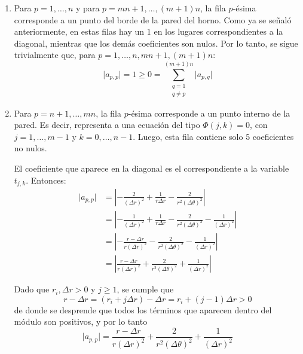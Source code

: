         \begin{enumerate}[label=(\roman*)]
            \item Para $p = 1, \dots, n$ y para $p = mn + 1, \dots, (m+1)n$, la fila $p$-ésima corresponde a un punto del borde de la pared del horno. Como ya se señaló anteriormente, en estas filas hay un $1$ en los lugares correspondientes a la diagonal, mientras que los demás coeficientes son nulos. Por lo tanto, se sigue trivialmente que, para $p = 1, \dots, n, mn + 1, (m+1)n$:
            \[ \vert a_{p,p} \vert = 1 \geq 0 = \sum_{\substack{q=1 \\ q \neq p}}^{(m+1)n} \vert a_{p,q} \vert \]

            \item Para $p = n + 1, \dots, mn$, la fila $p$-ésima corresponde a un punto interno de la pared. Es decir, representa a una ecuación del tipo $\Phi(j,k) = 0$, con $j = 1, \dots, m - 1$ y $k = 0, \dots, n - 1$. Luego, esta fila contiene solo 5 coeficientes no nulos.

            El coeficiente que aparece en la diagonal es el correspondiente a la variable $t_{j,k}$. Entonces:
            \[ \begin{split}
                \vert a_{p,p} \vert &= \left \vert - \frac{2}{(\Delta r)^2} + \frac{1}{r \Delta r} - \frac{2}{r^2 (\Delta \theta)^2} \right \vert \\
                &= \left \vert - \frac{1}{(\Delta r)^2} + \frac{1}{r \Delta r} - \frac{2}{r^2 (\Delta \theta)^2} - \frac{1}{(\Delta r)^2} \right \vert \\
                &= \left \vert - \frac{r - \Delta r}{r (\Delta r)^2} - \frac{2}{r^2 (\Delta \theta)^2} - \frac{1}{(\Delta r)^2} \right \vert \\
                &= \left \vert \frac{r - \Delta r}{r (\Delta r)^2} + \frac{2}{r^2 (\Delta \theta)^2} + \frac{1}{(\Delta r)^2} \right \vert
            \end{split} \]

            Dado que $r_i, \Delta r > 0$ y $j \geq 1$, se cumple que
            \[ r - \Delta r = (r_i + j \Delta r) - \Delta r = r_i + (j - 1) \Delta r > 0\]
            de donde se desprende que todos los términos que aparecen dentro del módulo son positivos, y por lo tanto
            \[ \vert a_{p,p} \vert = \frac{r - \Delta r}{r (\Delta r)^2} + \frac{2}{r^2 (\Delta \theta)^2} + \frac{1}{(\Delta r)^2} \]


\end{enumerate}
